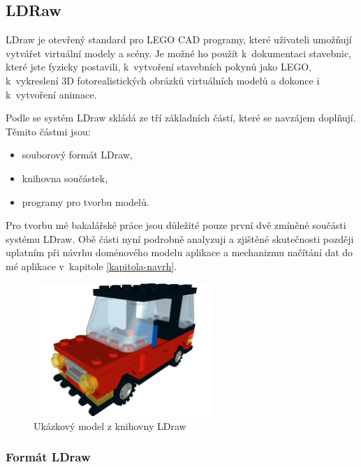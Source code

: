 \subsection{LDRaw}\label{reserse-ldraw}  
   
LDraw je otevřený standard pro LEGO \gls{CAD} programy, které uživateli umožňují vytvářet virtuální modely a scény. Je možné ho použít k~dokumentaci stavebnic, které jste fyzicky postavili, k~vytvoření stavebních pokynů jako LEGO, k~vykreslení 3D fotorealistických obrázků virtuálních modelů a dokonce i k~vytvoření animace. \autocite{ldraw:homepage}  

Podle \autocite[s.~30]{legobook} se systém LDraw skládá ze tří základních částí, které se navzájem doplňují. Těmito částmi jsou: 

\begin{itemize}
    \item souborový formát LDraw,
    \item knihovna součástek,
    \item programy pro tvorbu modelů. 
\end{itemize}

Pro tvorbu mé bakalářské práce jsou důležité pouze první dvě zmíněné součásti systému LDraw. Obě části nyní podrobně analyzuji a zjištěné skutečnosti později uplatním při návrhu doménového modelu aplikace a mechanizmu načítání dat do mé aplikace v~kapitole \ref{kapitola-navrh}.
    
\begin{figure}[htbp]
        \centering
        \includegraphics[width=0.6\textwidth,height=\textheight,keepaspectratio]{images/car.png}
        \caption{Ukázkový model z knihovny LDraw \autocite{ldraw:car}}
\end{figure}

    \subsubsection*{Formát LDraw}\label{ldraw-format}
    
